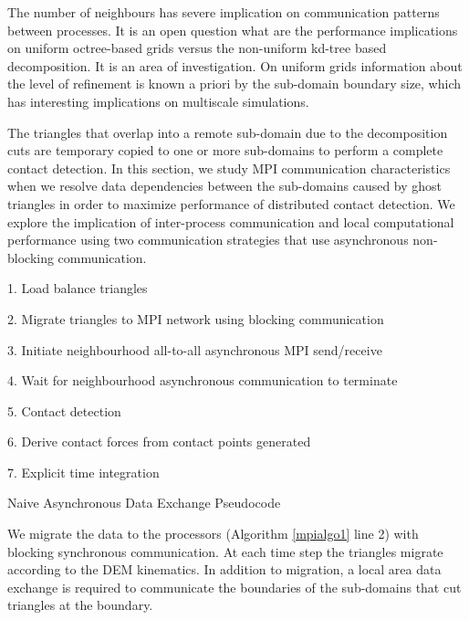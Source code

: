 \documentclass[times,12pt]{article}
\begin{document}
The number of neighbours has severe implication on communication patterns between processes. It is an open question what are the performance implications on uniform octree-based grids versus the non-uniform kd-tree based decomposition. It is an area of investigation. On uniform grids information about the level of refinement is known a priori by the sub-domain boundary size, which has interesting implications on multiscale simulations. 

The triangles that overlap into a remote sub-domain due to the decomposition cuts are temporary copied to one or more sub-domains to perform a complete contact detection. In this section, we study MPI communication characteristics when we resolve data dependencies between the sub-domains caused by ghost triangles in order to maximize performance of distributed contact detection. We explore the implication of inter-process communication and local computational performance using two communication strategies that use asynchronous non-blocking communication.

\begin{algorithm}
1. Load balance triangles

2. Migrate triangles to MPI network using blocking communication

3. Initiate neighbourhood all-to-all asynchronous MPI send/receive

4. Wait for neighbourhood asynchronous communication to terminate

5. Contact detection 

6. Derive contact forces from contact points generated

7. Explicit time integration

\protect\caption{\label{mpialgo1}Naive Asynchronous Data Exchange Pseudocode}
\end{algorithm}


We migrate the data to the processors (Algorithm \ref{mpialgo1} line 2) with blocking synchronous communication. At each time step the triangles migrate according to the DEM kinematics. In addition to migration, a local area data exchange is required to communicate the boundaries of the sub-domains that cut triangles at the boundary. 
\end{document}
